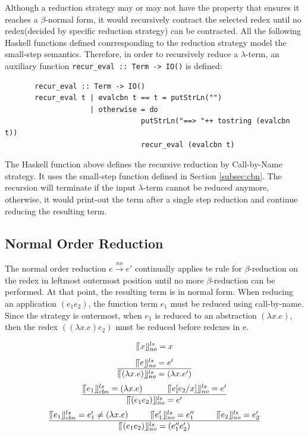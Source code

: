 \documentclass[a4paper,11pt,twoside]{report}
\begin{document}
Although a reduction strategy may or may not have the property that ensures it reaches a $\beta$-normal form, it would recursively contract the selected redex until no redex(decided by specific reduction strategy) can be contracted. All the following Haskell functions defined conrresponding to the reduction strategy model the small-step semantics. Therefore, in order to recursively reduce a $\lambda$-term, an auxiliary function \verb|recur_eval :: Term -> IO()| is defined:

\begin{verbatim}
       recur_eval :: Term -> IO()
       recur_eval t | evalcbn t == t = putStrLn("")
                    | otherwise = do
                                putStrLn("==> "++ tostring (evalcbn t))
                                recur_eval (evalcbn t)
\end{verbatim}

The Haskell function above defines the recursive reduction by Call-by-Name strategy. It uses the small-step function defined in Section \ref{subsec:cbn}. The recursion will terminate if the input $\lambda$-term cannot be reduced anymore, otherwise, it would print-out the term after a single step reduction and continue reducing the resulting term.



\subsection{Normal Order Reduction}{\label{subsec:normal}}

The normal order reduction $e\xrightarrow{no} e'$ continually applies te rule for $\beta$-reduction on the redex in leftmost outermost position until no more $\beta$-reduction can be performed. At that point, the resulting term is in normal form. When reducing an application $(e_1e_2)$, the function term $e_1$ must be reduced using call-by-name. Since the strategy is outermost, when $e_1$ is reduced to an abstraction $(\lambda x.e)$, then the redex $((\lambda x.e)e_2)$ must be reduced before redexes in e.

\begin{equation*}
\llceil x \rrfloor ^{ls} _{no} = x
\end{equation*}
\begin{equation*}
\frac{\llceil e \rrfloor ^{ls} _{no} = e'}{\llceil (\lambda x.e) \rrfloor ^{ls} _{no} = (\lambda x.e')}
\end{equation*}
\begin{equation*}
\frac{\llceil e_1 \rrfloor ^{ls} _{cbn} = (\lambda x.e)\ \ \ \ \ \ \ \ \ \llceil e[e_2/x] \rrfloor ^{ls} _{no} = e'}{\llceil (e_1e_2) \rrfloor ^{ls} _{no} = e'}
\end{equation*}
\begin{equation*}
\frac{\llceil e_1 \rrfloor ^{ls} _{cbn} = e'_1\neq (\lambda x.e)\ \ \ \ \ \ \ \ \llceil e'_1 \rrfloor ^{ls} _{no} = e''_1\ \ \ \ \ \ \ \ \llceil e_2 \rrfloor ^{ls} _{no} = e'_2}{\llceil (e_1e_2) \rrfloor ^{ls} _{no} = (e''_1e'_2)}
\end{equation*}
\end{document}
